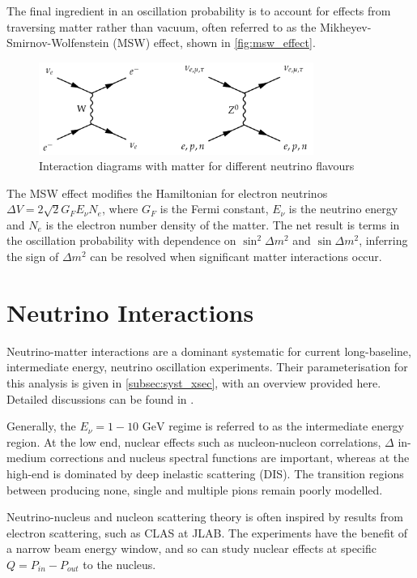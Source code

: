 The final ingredient in an oscillation probability is to account for effects from traversing matter rather than vacuum\cite{barger,parke,wolfenstein,msw}, often referred to as the Mikheyev-Smirnov-Wolfenstein (MSW) effect, shown in \autoref{fig:msw_effect}.
\begin{figure}[h]
	\includegraphics[width=0.8\textwidth, trim={0mm 0mm 0mm 0mm}, clip,page=1]{figures/theory/msw_effect}
	\caption{Interaction diagrams with matter for different neutrino flavours}
	\label{fig:msw_effect}
\end{figure}
The MSW effect modifies the Hamiltonian for electron neutrinos $\Delta V = 2\sqrt{2}G_F E_\nu N_e$, where $G_F$ is the Fermi constant, $E_\nu$ is the neutrino energy and $N_e$ is the electron number density of the matter. The net result is terms in the oscillation probability with dependence on $\sin^2 \Delta m^2$ and $\sin \Delta m^2$, inferring the sign of $\Delta m^2$ can be resolved when significant matter interactions occur\cite{msw_summary}.

\section{Neutrino Interactions}
\label{sec:theory:int}
Neutrino-matter interactions are a dominant systematic for current long-baseline, intermediate energy, neutrino oscillation experiments. Their parameterisation for this analysis is given in \autoref{subsec:syst_xsec}, with an overview provided here. Detailed discussions can be found in \cite{katori_martini,ulrich_review,nieves_review}.

Generally, the $E_\nu = 1-10\text{ GeV}$ regime is referred to as the intermediate energy region. At the low end, nuclear effects such as nucleon-nucleon correlations\cite{nieves1,nieves2}, $\Delta$ in-medium corrections\cite{nuclear_effects_1pi} and nucleus spectral functions \cite{benhar} are important, whereas at the high-end is dominated by deep inelastic scattering (DIS). The transition regions between producing none, single and multiple pions remain poorly modelled.

Neutrino-nucleus and nucleon scattering theory is often inspired by results from electron scattering\cite{joanna}, such as CLAS\cite{clas} at JLAB. The experiments have the benefit of a narrow beam energy window, and so can study nuclear effects at specific $Q=P_{in}-P_{out}$ to the nucleus. 

